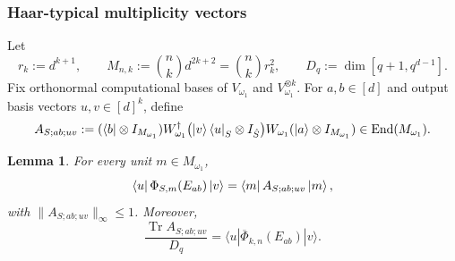 \documentclass[11pt,letterpaper]{article}
\theoremstyle{plain}
\theoremstyle{plain}
\theoremstyle{plain}
\theoremstyle{plain}
\theoremstyle{plain}
\theoremstyle{plain}
\newcommand{\End}{\mathrm{End}}
\theoremstyle{plain}
\newtheorem{smlemma}[smtheorem]{Lemma}
\theoremstyle{definition}
\theoremstyle{plain}
\begin{document}
\subsubsection{Haar-typical multiplicity vectors}\label{subsubsec:supple_haar_typical}

Let
\[
  r_k:=d^{k+1},
  \qquad
  M_{n,k}:=\binom nk d^{2k+2}=\binom nk r_k^2, \qquad D_q:=\operatorname{dim}\left[q+1, q^{d-1}\right].
\]
Fix orthonormal computational bases of $V_{\omega_1}$ and $V_{\omega_1}^{\otimes k}$. 
For $a,b\in[d]$ and output basis vectors $u,v\in[d]^k$, define
\begin{equation}
\label{eq:test-operator}
  A_{S;ab;uv}
  :=(\bra b\otimes I_{M_{\omega_1}})
  W_{\omega_1}^\dagger\bigl(\ket v\bra u_S\otimes I_{\hat S}\bigr)W_{\omega_1}
  (\ket a\otimes I_{M_{\omega_1}})
  \in\End(M_{\omega_1}).
\end{equation}

\begin{smlemma}
\label{lem:quadratic-form}
For every unit $m\in M_{\omega_1}$,
\begin{equation}
\label{eq:entry-quadratic}
  \bra u\Phi_{S,m}(E_{ab})\ket v
  =\bra m A_{S;ab;uv}\ket m,
\end{equation}
with $\|A_{S;ab;uv}\|_\infty\le1$. Moreover,
\begin{equation}
    \frac{\operatorname{Tr} A_{S ; a b ; u v}}{D_q}=\langle u| \overline{\Phi}_{k,n}\left(E_{a b}\right)|v\rangle .
\end{equation}
\end{smlemma}
\end{document}
